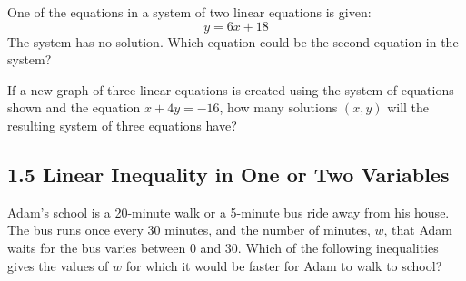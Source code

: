 One of the equations in a system of two linear equations is given:
\[
y = 6x + 18
\]
The system has no solution. Which equation could be the second equation in the system?

\vspace{0.75em}



\newpage 
\noindent\markforreview

\vspace{1em}

\begin{center}
\end{center}

If a new graph of three linear equations is created using the system of equations shown and the equation \( x + 4y = -16 \), how many solutions \( (x, y) \) will the resulting system of three equations have?

\vspace{0.75em}



\newpage
\subsection*{1.5 Linear Inequality in One or Two Variables}
\vspace{0.5em}

\setcounter{questionnum}{0}


\noindent\markforreview

\vspace{1em}

Adam’s school is a 20-minute walk or a 5-minute bus ride away from his house. The bus runs once every 30 minutes, and the number of minutes, \( w \), that Adam waits for the bus varies between 0 and 30. Which of the following inequalities gives the values of \( w \) for which it would be faster for Adam to walk to school?

